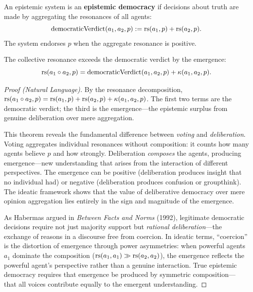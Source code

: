 \begin{definition}
\label{def:epistemic-democracy}
An epistemic system is an \textbf{epistemic democracy} if decisions about truth
are made by aggregating the resonances of all agents:
\[
  \mathrm{democraticVerdict}(a_1, a_2, p) := \mathrm{rs}(a_1, p) + \mathrm{rs}(a_2, p).
\]
The system endorses $p$ when the aggregate resonance is positive.
\end{definition}

\begin{theorem}
\label{thm:democratic-surplus}
The collective resonance exceeds the democratic verdict by the emergence:
\[
  \mathrm{rs}(a_1 \circ a_2, p) = \mathrm{democraticVerdict}(a_1, a_2, p) + \kappa(a_1, a_2, p).
\]
\end{theorem}

\begin{proof}[Proof (Natural Language)]
By the resonance decomposition, $\mathrm{rs}(a_1 \circ a_2, p) = \mathrm{rs}(a_1, p) + \mathrm{rs}(a_2, p) +
\kappa(a_1, a_2, p)$. The first two terms are the democratic verdict; the third is
the emergence---the epistemic surplus from genuine deliberation over mere aggregation.

This theorem reveals the fundamental difference between \emph{voting} and
\emph{deliberation}. Voting aggregates individual resonances without composition:
it counts how many agents believe $p$ and how strongly. Deliberation \emph{composes}
the agents, producing emergence---new understanding that arises from the interaction
of different perspectives. The emergence can be positive (deliberation produces
insight that no individual had) or negative (deliberation produces confusion or
groupthink). The ideatic framework shows that the value of deliberative democracy
over mere opinion aggregation lies entirely in the sign and magnitude of the emergence.

As Habermas argued in \emph{Between Facts and Norms} (1992), legitimate democratic
decisions require not just majority support but \emph{rational deliberation}---the
exchange of reasons in a discourse free from coercion. In ideatic terms, ``coercion''
is the distortion of emergence through power asymmetries: when powerful agents
$a_1$ dominate the composition ($\mathrm{rs}(a_1, a_1) \gg \mathrm{rs}(a_2, a_2)$), the emergence
reflects the powerful agent's perspective rather than a genuine interaction. True
epistemic democracy requires that emergence be produced by symmetric composition---
that all voices contribute equally to the emergent understanding.
\end{proof}

